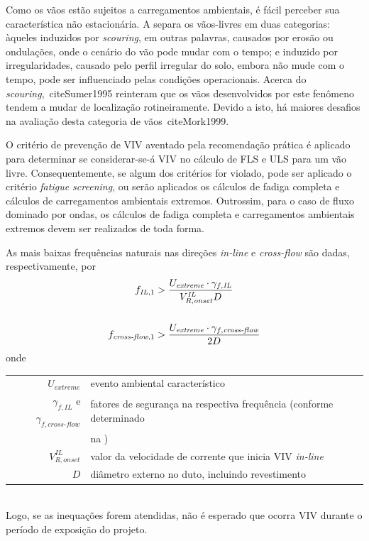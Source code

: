 Como os vãos estão sujeitos a carregamentos ambientais, é fácil perceber sua característica não estacionária.
A  separa os vãos-livres em duas categorias: àqueles induzidos por \textit{scouring}, em outras palavras, causados por erosão ou ondulações, onde o cenário do vão pode mudar com o tempo; e induzido por irregularidades, causado pelo perfil irregular do solo, embora não mude com o tempo, pode ser influenciado pelas condições operacionais.
Acerca do \textit{scouring},~cite{Sumer1995} reinteram que os vãos desenvolvidos por este fenômeno tendem a mudar de localização rotineiramente.
Devido a isto, há maiores desafios na avaliação desta categoria de vãos~cite{Mork1999}.

O critério de prevenção de VIV aventado pela recomendação prática é aplicado para determinar se considerar-se-á VIV no cálculo de FLS e ULS para um vão livre.
Consequentemente, se algum dos critérios for violado, pode ser aplicado o critério \textit{fatigue screening}, ou serão aplicados os cálculos de fadiga completa e cálculos de carregamentos ambientais extremos.
Outrossim, para o caso de fluxo dominado por ondas, os cálculos de fadiga completa e carregamentos ambientais extremos devem ser realizados de toda forma.

As mais baixas frequências naturais nas direções \textit{in-line} e \textit{cross-flow} são dadas, respectivamente, por
\begin{equation}
\label{eq:viv-ineq}
\begin{aligned}
f_{\mathit{IL},1} &> \frac{U_\mathit{extreme} \cdot \gamma_{f, \mathit{IL}}}{ V_{R, \mathit{onset}}^\mathit{IL} D}\\
\\
f_{\mathit{\textit{cross-flow}},1} &> \frac{U_\mathit{extreme} \cdot \gamma_{f, \mathit{\textit{cross-flow}}}}{2 D}
\end{aligned}\\
\end{equation}
onde

\begin{tabular}{rl}
	$U_\mathit{extreme}$                                  & evento ambiental característico\\
	$\gamma_{f,\mathit{IL}}$  e  $\gamma_{f,\mathit{\textit{cross-flow}}}$ & fatores de segurança na respectiva frequência (conforme determinado \\
 	                                                      & na \dnvf105)\\
	$V_{R,\mathit{onset}}^\mathit{IL}$                    & valor da  velocidade de corrente que inicia VIV \textit{in-line}\\
	$D$                                                   & diâmetro externo no duto, incluindo revestimento
\end{tabular}\\
Logo, se as inequações forem atendidas, não é esperado que ocorra VIV durante o período de exposição do projeto.


